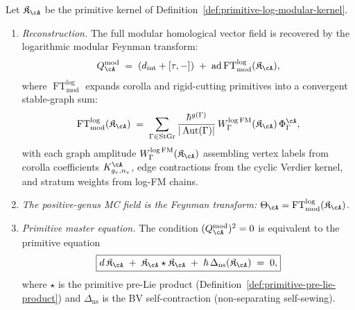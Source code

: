 \begin{theorem}
\label{thm:primitive-to-global-reconstruction}
\ClaimStatusProvedHere
{}
Let $\mathfrak{K}_\cA$ be the primitive kernel of
Definition~\textup{\ref{def:primitive-log-modular-kernel}}.
\begin{enumerate}[label=\textup{(\roman*)}]
\item \emph{Reconstruction.}  The full modular homological vector
  field is recovered by the logarithmic modular Feynman transform:
  \begin{equation}
  \label{eq:primitive-reconstruction}
  Q_\cA^{\mathrm{mod}}
  \;=\;
  (d_{\mathrm{int}} + [\tau, -])
  \;+\;
  \operatorname{ad}
  \operatorname{FT}^{\log}_{\mathrm{mod}}(\mathfrak{K}_\cA),
  \end{equation}
  where $\operatorname{FT}^{\log}_{\mathrm{mod}}$ expands corolla
  and rigid-cutting primitives into a convergent stable-graph sum:
  \begin{equation}
  \label{eq:feynman-transform-expansion}
  \operatorname{FT}^{\log}_{\mathrm{mod}}(\mathfrak{K}_\cA)
  \;=\;
  \sum_{\Gamma \in \operatorname{StGr}}
  \frac{\hbar^{g(\Gamma)}}{|\operatorname{Aut}(\Gamma)|}
  \,W_\Gamma^{\log\mathrm{FM}}(\mathfrak{K}_\cA)
  \,\Phi_\Gamma^\cA,
  \end{equation}
  with each graph amplitude $W_\Gamma^{\log\mathrm{FM}}(\mathfrak{K}_\cA)$
  assembling vertex labels from corolla coefficients $K_{g_v,n_v}^\cA$,
  edge contractions from the cyclic Verdier kernel, and
  stratum weights from log-FM chains.
\item \emph{The positive-genus MC field is the Feynman transform:}
  $\Theta_\cA = \operatorname{FT}^{\log}_{\mathrm{mod}}(\mathfrak{K}_\cA)$.
\item \emph{Primitive master equation.}  The condition
  $(Q_\cA^{\mathrm{mod}})^2 = 0$ is equivalent to the primitive
  equation
  \begin{equation}
  \label{eq:primitive-master-equation}
  \boxed{%
  d\,\mathfrak{K}_\cA
  \;+\;
  \mathfrak{K}_\cA \star \mathfrak{K}_\cA
  \;+\;
  \hbar\,\Delta_{\mathrm{ns}}(\mathfrak{K}_\cA)
  \;=\; 0,
  }
  \end{equation}
  where $\star$ is the primitive pre-Lie product
  (Definition~\ref{def:primitive-pre-lie-product})
  and $\Delta_{\mathrm{ns}}$ is the BV self-contraction
  (non-separating self-sewing).
\end{enumerate}
\end{theorem}

